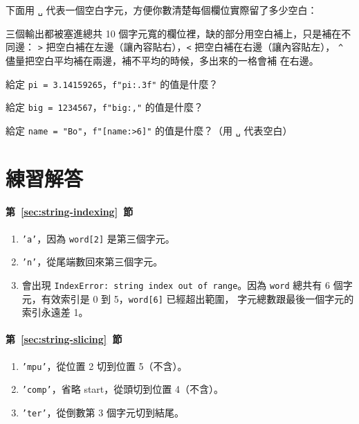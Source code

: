 下面用 \texttt{␣} 代表一個空白字元，方便你數清楚每個欄位實際留了多少空白：

\iosample{}{[␣␣␣␣␣␣␣Bob] \\{} [Bob␣␣␣␣␣␣␣] \\{} [␣␣␣Bob␣␣␣␣] \\}

三個輸出都被塞進總共 10 個字元寬的欄位裡，缺的部分用空白補上，只是補在不同邊：
\texttt{>} 把空白補在左邊（讓內容貼右），\texttt{<} 把空白補在右邊（讓內容貼左），
\texttt{\textasciicircum} 儘量把空白平均補在兩邊，補不平均的時候，多出來的一格會補
在右邊。

\begin{drills}[label=drills:f-string-format]
\item 給定 \texttt{pi = 3.14159265}，\texttt{f"{pi:.3f}"} 的值是什麼？
\item 給定 \texttt{big = 1234567}，\texttt{f"{big:,}"} 的值是什麼？
\item 給定 \texttt{name = "Bo"}，\texttt{f"[{name:>6}]"} 的值是什麼？（用 \texttt{␣}
代表空白）
\end{drills}

\section*{練習解答}

\paragraph{第~\ref{sec:string-indexing}~節}
\begin{enumerate}
\item \texttt{'a'}，因為 \texttt{word[2]} 是第三個字元。
\item \texttt{'n'}，從尾端數回來第三個字元。
\item 會出現 \texttt{IndexError: string index out of range}。因為
\texttt{word} 總共有 6 個字元，有效索引是 0 到 5，\texttt{word[6]} 已經超出範圍，
字元總數跟最後一個字元的索引永遠差 1。
\end{enumerate}

\paragraph{第~\ref{sec:string-slicing}~節}
\begin{enumerate}
\item \texttt{'mpu'}，從位置 2 切到位置 5（不含）。
\item \texttt{'comp'}，省略 start，從頭切到位置 4（不含）。
\item \texttt{'ter'}，從倒數第 3 個字元切到結尾。
\end{enumerate}

